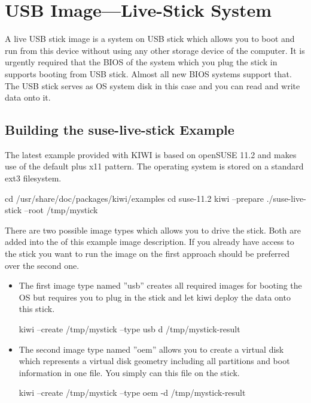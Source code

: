 \chapter{USB Image---Live-Stick System}
\label{chapter:usb}
\minitoc

A live USB stick image is a system on USB stick which allows you to
boot and run from this device without using any other storage device of
the computer. It is urgently required that the BIOS of the system which
you plug the stick in supports booting from USB stick. Almost all
new BIOS systems support that. The USB stick serves as OS system disk
in this case and you can read and write data onto it.

\section{Building the suse-live-stick Example}

The latest example provided with KIWI is based on openSUSE 11.2 and makes use
of the default plus x11 pattern. The operating system is stored on a
standard ext3 filesystem. 

\begin{Command}{12cm}
cd /usr/share/doc/packages/kiwi/examples
cd suse-11.2
kiwi --prepare ./suse-live-stick --root /tmp/mystick
\end{Command}

There are two possible image types which allows you to drive the
stick. Both are added into the  of this example image
description. If you already have access to the stick you want to
run the image on the first approach should be preferred over the
second one.

\begin{itemize}
\item The first image type named ''usb'' creates all required
      images for booting the OS but requires you to plug in the stick
      and let kiwi deploy the data onto this stick.

\begin{Command}{12cm}
kiwi --create /tmp/mystick --type usb d /tmp/mystick-result
\end{Command}

\item The second image type named ''oem'' allows you to create a
      virtual disk which represents a virtual disk geometry including
      all partitions and boot information in one file. You simply can 
      this file on the stick.

\begin{Command}{12cm}
kiwi --create /tmp/mystick --type oem -d /tmp/mystick-result
\end{Command}
\end{itemize}

